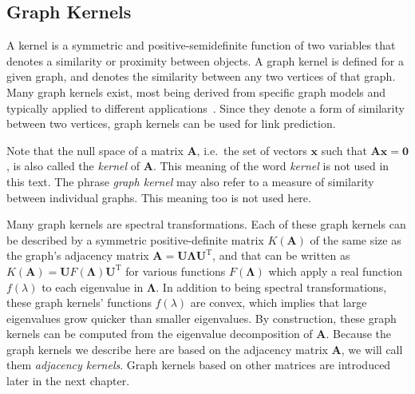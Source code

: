 \documentclass[11pt,a4paper]{book}
\begin{document}
\subsection{Graph Kernels}
\label{sec:spectral-evolution-model:explanations:graph-kernels}
A kernel is a symmetric and positive-semidefinite function of two
variables that denotes a similarity or proximity between objects.  A graph
kernel is defined for a given graph, and denotes the similarity between any
two vertices of that graph.  Many graph kernels exist, most being derived from
specific graph models and typically applied to different
applications~\cite{b137,b152,b155,b156}. 
Since they denote a form of similarity between two vertices, graph
kernels can be used for link prediction.  

Note that the null space of a matrix $\mathbf A$, i.e.\ the set of
vectors $\mathbf x$ such that $\mathbf A \mathbf x=\mathbf 0$, is also called
the \emph{kernel} of $\mathbf A$.  This meaning of the word
\emph{kernel} is not used in this text.  
The phrase \emph{graph kernel} may also refer to a measure of
similarity between individual graphs.  This meaning too is not used
here. 

Many graph kernels are spectral transformations. 
Each of these graph kernels can be described
by a symmetric positive-definite matrix $K(\mathbf A)$ of the same size
as the 
graph's adjacency matrix $\mathbf A=\mathbf U\mathbf \Lambda \mathbf
U^{\mathrm T}$, and that can be written 
as $K(\mathbf A) = \mathbf U F(\mathbf
\Lambda)\mathbf U^{\mathrm T}$ for various functions 
$F(\mathbf \Lambda)$ which apply a real function $f(\lambda)$ to each
eigenvalue in $\mathbf \Lambda$.  In addition to being spectral
transformations, these graph kernels' functions $f(\lambda)$ are convex,
which implies that large eigenvalues grow quicker than smaller
eigenvalues.  By construction, these graph kernels can be computed
from the eigenvalue decomposition of $\mathbf A$. 
Because the graph kernels we describe here are based on the adjacency
matrix $\mathbf A$, we will call them \emph{adjacency kernels}.  Graph
kernels based on other matrices are introduced later in the next
chapter. 
\end{document}
